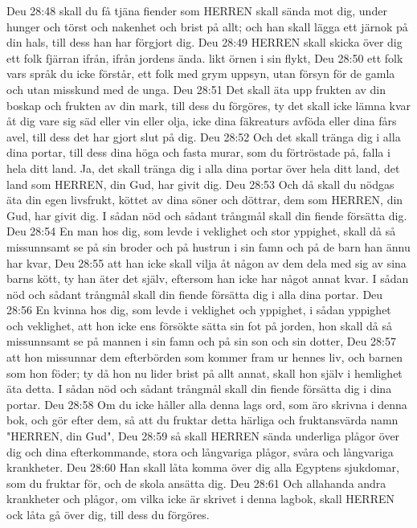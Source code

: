 Deu 28:48  skall du få tjäna fiender som HERREN skall sända mot dig, under hunger och törst och nakenhet och brist på allt; och han skall lägga ett järnok på din hals, till dess han har förgjort dig.
Deu 28:49  HERREN skall skicka över dig ett folk fjärran ifrån, ifrån jordens ända. likt örnen i sin flykt,
Deu 28:50  ett folk vars språk du icke förstår, ett folk med grym uppsyn, utan försyn för de gamla och utan misskund med de unga.
Deu 28:51  Det skall äta upp frukten av din boskap och frukten av din mark, till dess du förgöres, ty det skall icke lämna kvar åt dig vare sig säd eller vin eller olja, icke dina fäkreaturs avföda eller dina fårs avel, till dess det har gjort slut på dig.
Deu 28:52  Och det skall tränga dig i alla dina portar, till dess dina höga och fasta murar, som du förtröstade på, falla i hela ditt land. Ja, det skall tränga dig i alla dina portar över hela ditt land, det land som HERREN, din Gud, har givit dig.
Deu 28:53  Och då skall du nödgas äta din egen livsfrukt, köttet av dina söner och döttrar, dem som HERREN, din Gud, har givit dig. I sådan nöd och sådant trångmål skall din fiende försätta dig.
Deu 28:54  En man hos dig, som levde i veklighet och stor yppighet, skall då så missunnsamt se på sin broder och på hustrun i sin famn och på de barn han ännu har kvar,
Deu 28:55  att han icke skall vilja åt någon av dem dela med sig av sina barns kött, ty han äter det själv, eftersom han icke har något annat kvar. I sådan nöd och sådant trångmål skall din fiende försätta dig i alla dina portar.
Deu 28:56  En kvinna hos dig, som levde i veklighet och yppighet, i sådan yppighet och veklighet, att hon icke ens försökte sätta sin fot på jorden, hon skall då så missunnsamt se på mannen i sin famn och på sin son och sin dotter,
Deu 28:57  att hon missunnar dem efterbörden som kommer fram ur hennes liv, och barnen som hon föder; ty då hon nu lider brist på allt annat, skall hon själv i hemlighet äta detta. I sådan nöd och sådant trångmål skall din fiende försätta dig i dina portar.
Deu 28:58  Om du icke håller alla denna lags ord, som äro skrivna i denna bok, och gör efter dem, så att du fruktar detta härliga och fruktansvärda namn "HERREN, din Gud",
Deu 28:59  så skall HERREN sända underliga plågor över dig och dina efterkommande, stora och långvariga plågor, svåra och långvariga krankheter.
Deu 28:60  Han skall låta komma över dig alla Egyptens sjukdomar, som du fruktar för, och de skola ansätta dig.
Deu 28:61  Och allahanda andra krankheter och plågor, om vilka icke är skrivet i denna lagbok, skall HERREN ock låta gå över dig, till dess du förgöres.
